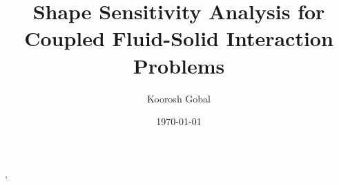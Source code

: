\documentclass[12pt]{report}
\title{Shape Sensitivity Analysis for Coupled Fluid-Solid Interaction Problems}
\author{Koorosh Gobal}
\date{\today}
\begin{document}
\maketitle
\tableofcontents
\listoffigures
\listoftables








%

,
\end{document}
